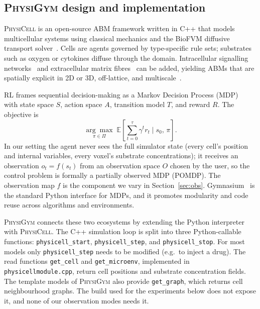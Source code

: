 \documentclass{article}
\newcommand{\physigym}{\textsc{PhysiGym}}
\newcommand{\physicell}{\textsc{PhysiCell}}
\begin{document}
\subsection{\physigym{} design and implementation}
\label{sec:physigym}

\physicell{} is an open-source ABM framework written in C++ that models
multicellular systems using classical mechanics and the BioFVM diffusive
transport solver~\citep{ghaffarizadeh2018physicell, ghaffarizadeh2016biofvm}.
Cells are agents governed by type-specific rule sets; substrates such as oxygen
or cytokines diffuse through the domain. Intracellular signalling
networks~\citep{letort2018physiboss, ponce2023physiboss, ruscone2024physiboss}
and extracellular matrix fibres~\citep{noel2024physimess} can be added, yielding
ABMs that are spatially explicit in 2D or 3D, off-lattice, and
multiscale~\citep{metzcar2019review}.

RL frames sequential decision-making as a Markov Decision Process
(MDP)~\citep{bellman1957markovian, puterman2014markov} with state space $S$,
action space $A$, transition model $T$, and reward $R$.
The objective is
\[
  \underset{\pi\in\Pi}{\arg\max}\;
  \mathbb{E}\!\left[\sum_{t=0}^{\tau}\gamma^t r_t \mid s_0,\,\pi\right].
\]
In our setting the agent never sees the full simulator state (every cell's
position and internal variables, every voxel's substrate concentrations); it
receives an observation $o_t = f(s_t)$ from an observation space $O$ chosen by the
user, so the control problem is formally a partially observed MDP (POMDP). The
observation map $f$ is the component we vary in Section~\ref{sec:obs}.
Gymnasium~\citep{towers2024gymnasium} is the standard Python interface for MDPs,
and it promotes modularity and code reuse across algorithms and environments.

\physigym{} connects these two ecosystems by extending the Python
interpreter~\citep{rossum1995extending, psf2024extending} with \physicell{}.
The C++ simulation loop is split into three Python-callable functions:
\texttt{physicell\_start}, \texttt{physicell\_step}, and
\texttt{physicell\_stop}. For most models only \texttt{physicell\_step} needs
to be modified (e.g.\ to inject a drug). The read functions
\texttt{get\_cell} and \texttt{get\_microenv}, implemented in
\texttt{physicellmodule.cpp}, return cell positions and substrate concentration
fields. The template models of \physigym{} also provide \texttt{get\_graph},
which returns cell neighbourhood graphs. The build used for the experiments
below does not expose it, and none of our observation modes needs it.
\end{document}
